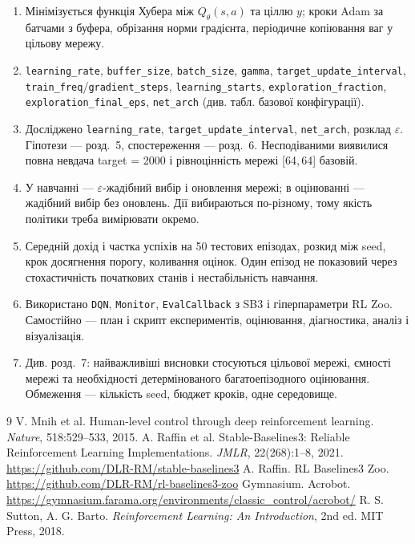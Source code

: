 \documentclass[11pt,a4paper]{article}
\newcommand{\code}[1]{\texttt{#1}}
\begin{document}
\begin{enumerate}[leftmargin=*]
\item Мінімізується функція Хубера між $Q_\theta(s,a)$ та ціллю $y$; кроки Adam за батчами з буфера, обрізання норми градієнта, періодичне копіювання ваг у цільову мережу.
\item \code{learning\_rate}, \code{buffer\_size}, \code{batch\_size}, \code{gamma}, \code{target\_update\_interval}, \code{train\_freq}/\code{gradient\_steps}, \code{learning\_starts}, \code{exploration\_fraction}, \code{exploration\_final\_eps}, \code{net\_arch} (див. табл. базової конфігурації).
\item Досліджено \code{learning\_rate}, \code{target\_update\_interval}, \code{net\_arch}, розклад $\varepsilon$. Гіпотези — розд.~5, спостереження — розд.~6. Несподіваними виявилися повна невдача target = 2000 і рівноцінність мережі [64,\,64] базовій.
\item У навчанні — $\varepsilon$-жадібний вибір і оновлення мережі; в оцінюванні — жадібний вибір без оновлень. Дії вибираються по-різному, тому якість політики треба вимірювати окремо.
\item Середній дохід і частка успіхів на 50 тестових епізодах, розкид між seed, крок досягнення порогу, коливання оцінок. Один епізод не показовий через стохастичність початкових станів і нестабільність навчання.
\item Використано \code{DQN}, \code{Monitor}, \code{EvalCallback} з SB3 і гіперпараметри RL Zoo. Самостійно — план і скрипт експериментів, оцінювання, діагностика, аналіз і візуалізація.
\item Див. розд.~7: найважливіші висновки стосуються цільової мережі, ємності мережі та необхідності детермінованого багатоепізодного оцінювання. Обмеження — кількість seed, бюджет кроків, одне середовище.
\end{enumerate}

\begin{thebibliography}{9}
 V. Mnih et al. Human-level control through deep reinforcement learning. \emph{Nature}, 518:529–533, 2015.
 A. Raffin et al. Stable-Baselines3: Reliable Reinforcement Learning Implementations. \emph{JMLR}, 22(268):1–8, 2021. \url{https://github.com/DLR-RM/stable-baselines3}
 A. Raffin. RL Baselines3 Zoo. \url{https://github.com/DLR-RM/rl-baselines3-zoo}
 Gymnasium. Acrobot. \url{https://gymnasium.farama.org/environments/classic_control/acrobot/}
 R. S. Sutton, A. G. Barto. \emph{Reinforcement Learning: An Introduction}, 2nd ed. MIT Press, 2018.
\end{thebibliography}
\end{document}
